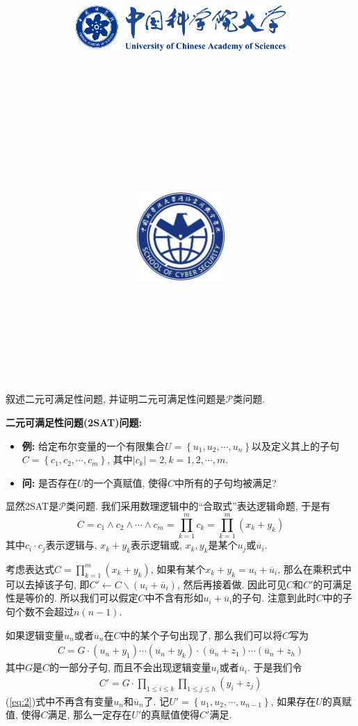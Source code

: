 \documentclass{article}
\title{
	\includegraphics[width=0.6\textwidth]{images/title/ucas_logo 1.pdf}\\
    \vspace{1in}
    \textmd{\textbf{\hmwkClass}}\\
	\textmd{\Large{\textbf{\hmwkClassID}}}\\
    \textmd{\textbf{\hmwkTitle}}\\
    \normalsize\vspace{0.1in}\large{\hmwkCompleteTime }\\
    \vspace{0.1in}\large{\textit{\hmwkClassInstructor\ }}\\
    \vspace{1in}
	\includegraphics[width=0.25\textwidth]{images/title/Cyber.jpg}\\
	\vspace{1in}
}
\author{
	\hmwkAuthorName \\ 
	\hmwkAuthorStuID \\
	\hmwkAuthorInst \\
	\hmwkAuthorzhuanye \\
	\hmwkAuthorfangxiang
	}
\date{}
\begin{document}
\maketitle


%
%
%
%
%


\pagebreak



\begin{homeworkProblem}
	叙述二元可满足性问题, 并证明二元可满足性问题是$\mathcal{P}$类问题.

	\solution \textbf{二元可满足性问题(2SAT)问题:}
	\begin{itemize}
		\item \textbf{例:} 给定布尔变量的一个有限集合$U=\left\{ u_1,u_2,\cdots ,u_n \right\}$以及定义其上的子句$C=\left\{ c_1,c_2,\cdots ,c_m \right\}$, 其中$|c_k|=2,k=1,2,\cdots,m$.
		\item \textbf{问:} 是否存在$U$的一个真赋值, 使得$C$中所有的子句均被满足? 
	\end{itemize}

	显然2SAT是$\mathcal{P}$类问题. 我们采用数理逻辑中的“合取式”表达逻辑命题, 于是有$$C=c_1\land c_2\land \cdots \land c_m=\prod_{k=1}^m{c_k}=\prod_{k=1}^m{\left( x_k+y_k \right)}
	$$
	其中$c_i\cdot c_j$表示逻辑与, $x_k+y_k$表示逻辑或, $x_k,y_k$是某个$u_j$或$\overline{u}_i$.

	考虑表达式$\displaystyle C=\prod_{k=1}^m{\left( x_k+y_k \right)}$, 如果有某个$x_k+y_k=u_i+\overline{u}_i$, 那么在乘积式中可以去掉该子句, 即$C'\gets C\backslash (u_i+\overline{u}_i)$, 然后再接着做. 因此可见$C$和$C'$的可满足性是等价的. 所以我们可以假定$C$中不含有形如$u_i+\overline{u}_i$的子句. 注意到此时$C$中的子句个数不会超过$n(n-1)$.

	如果逻辑变量$u_n$或者$\overline{u}_n$在$C$中的某个子句出现了, 那么我们可以将$C$写为
	\begin{align}
		C=G\cdot \left( u_n+y_1 \right) \cdots \left( u_n+y_k \right) \cdot \left( \overline{u}_n+z_1 \right) \cdots \left( \overline{u}_n+z_h \right)  \tag{1}
	\end{align}
	其中$G$是$C$的一部分子句, 而且不会出现逻辑变量$u_i$或者$\overline{u}_i$. 于是我们令
	\begin{align}
		C'=G\cdot \prod_{1\le i\le k}{\prod_{1\le j\le h}{\left( y_i+z_j \right)}} \tag{2} \label{eq:2}
	\end{align}
	(\ref{eq:2})式中不再含有变量$u_n$和$\overline{u}_n$了. 记$U'=\left\{ u_1,u_2,\cdots ,u_{n-1} \right\}$, 如果存在$U$的真赋值, 使得$C$满足, 那么一定存在$U'$的真赋值使得$C'$满足.


\end{homeworkProblem}
\end{document}
